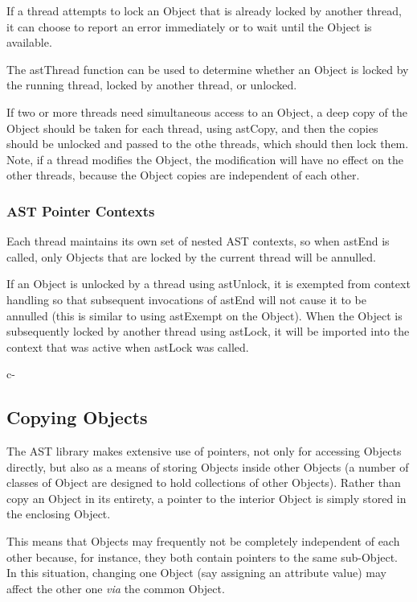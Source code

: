 \documentclass[twoside,11pt]{starlink}
\begin{document}
If a thread attempts to lock an Object that is already locked by another
thread, it can choose to report an error immediately or to wait until the
Object is available.

The astThread function can be used to determine whether an Object is
locked by the running thread, locked by another thread, or unlocked.

If two or more threads need simultaneous access to an Object, a deep copy
of the Object should be taken for each thread, using astCopy, and then
the copies should be unlocked and passed to the othe threads, which
should then lock them. Note, if a thread modifies the Object, the
modification will have no effect on the other threads, because the Object
copies are independent of each other.

\subsubsection{AST Pointer Contexts}

Each thread maintains its own set of nested AST contexts, so when astEnd
is called, only Objects that are locked by the current thread will
be annulled.

If an Object is unlocked by a thread using astUnlock, it is exempted from
context handling so that subsequent invocations of astEnd will not cause it
to be annulled (this is similar to using astExempt on the Object). When the
Object is subsequently locked by another thread using astLock, it will be
imported into the context that was active when astLock was called.

c-


\subsection{\label{ss:copyingobjects}Copying Objects}

The AST library makes extensive use of pointers, not only for
accessing Objects directly, but also as a means of storing Objects
inside other Objects (a number of classes of Object are designed to
hold collections of other Objects). Rather than copy an Object in its
entirety, a pointer to the interior Object is simply stored in the
enclosing Object.

This means that Objects may frequently not be completely independent
of each other because, for instance, they both contain pointers to the
same sub-Object. In this situation, changing one Object (say assigning
an attribute value) may affect the other one \emph{via} the common
Object.
\end{document}
